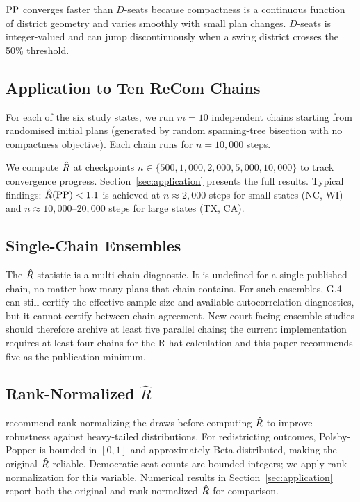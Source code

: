 $\mathrm{PP}$ converges faster than $D$-seats because compactness is a continuous
function of district geometry and varies smoothly with small plan changes.
$D$-seats is integer-valued and can jump discontinuously when a swing
district crosses the 50\% threshold.

\subsection{Application to Ten ReCom Chains}

For each of the six study states, we run $m = 10$ independent \recom{}
chains starting from randomised initial plans (generated by random
spanning-tree bisection with no compactness objective).
Each chain runs for $n = 10{,}000$ steps.

We compute $\hat{R}$ at checkpoints $n \in \{500, 1{,}000, 2{,}000, 5{,}000, 10{,}000\}$
to track convergence progress.
Section~\ref{sec:application} presents the full results.
Typical findings: $\hat{R}(\mathrm{PP}) < 1.1$ is achieved at $n \approx 2{,}000$
steps for small states (NC, WI) and $n \approx 10{,}000$--$20{,}000$
steps for large states (TX, CA).

\subsection{Single-Chain Ensembles}

The $\hat{R}$ statistic is a multi-chain diagnostic. It is undefined for a
single published chain, no matter how many plans that chain contains. For such
ensembles, G.4 can still certify the effective sample size and available
autocorrelation diagnostics, but it cannot certify between-chain agreement.
New court-facing ensemble studies should therefore archive at least five
parallel chains; the current implementation requires at least four chains for
the R-hat calculation and this paper recommends five as the publication
minimum.

\subsection{Rank-Normalized $\hat{R}$}

\citet{vehtari2021} recommend rank-normalizing the draws before computing
$\hat{R}$ to improve robustness against heavy-tailed distributions.
For redistricting outcomes, Polsby-Popper is bounded in $[0, 1]$ and
approximately Beta-distributed, making the original $\hat{R}$ reliable.
Democratic seat counts are bounded integers; we apply rank normalization
for this variable.
Numerical results in Section~\ref{sec:application} report both the
original and rank-normalized $\hat{R}$ for comparison.
